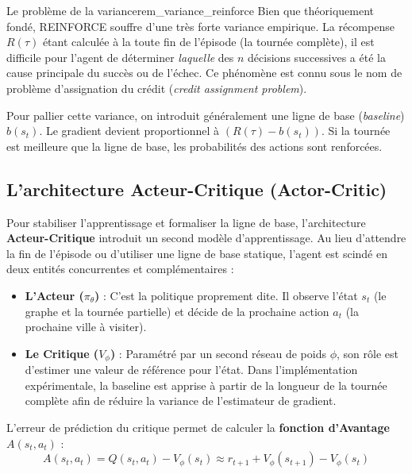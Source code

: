 \documentclass[12pt, a4paper, twoside, openright]{book}
\begin{document}
	\begin{remark}{Le problème de la variance}{rem_variance_reinforce}
		Bien que théoriquement fondé, REINFORCE souffre d'une très forte variance empirique. La récompense $R(\tau)$ étant calculée à la toute fin de l'épisode (la tournée complète), il est difficile pour l'agent de déterminer \textit{laquelle} des $n$ décisions successives a été la cause principale du succès ou de l'échec. Ce phénomène est connu sous le nom de problème d'assignation du crédit (\textit{credit assignment problem}).
	\end{remark}
	
	Pour pallier cette variance, on introduit généralement une ligne de base (\textit{baseline}) $b(s_t)$. Le gradient devient proportionnel à $(R(\tau) - b(s_t))$. Si la tournée est meilleure que la ligne de base, les probabilités des actions sont renforcées.
	
	\subsection{L'architecture Acteur-Critique (Actor-Critic)}
	
	Pour stabiliser l'apprentissage et formaliser la ligne de base, l'architecture \textbf{Acteur-Critique} introduit un second modèle d'apprentissage. Au lieu d'attendre la fin de l'épisode ou d'utiliser une ligne de base statique, l'agent est scindé en deux entités concurrentes et complémentaires :
	
	\begin{itemize}
		\item \textbf{L'Acteur ($\pi_\theta$)} : C'est la politique proprement dite. Il observe l'état $s_t$ (le graphe et la tournée partielle) et décide de la prochaine action $a_t$ (la prochaine ville à visiter).
		\item \textbf{Le Critique ($V_\phi$)} : Paramétré par un second réseau de poids $\phi$, son rôle est d'estimer une valeur de référence pour l'état. Dans l'implémentation expérimentale, la baseline est apprise à partir de la longueur de la tournée complète afin de réduire la variance de l'estimateur de gradient.
	\end{itemize}
	
	L'erreur de prédiction du critique permet de calculer la \textbf{fonction d'Avantage} $A(s_t, a_t)$ :
	\begin{equation}
		A(s_t, a_t) = Q(s_t, a_t) - V_\phi(s_t) \approx r_{t+1} + V_\phi(s_{t+1}) - V_\phi(s_t)
	\end{equation}
	
\end{document}
